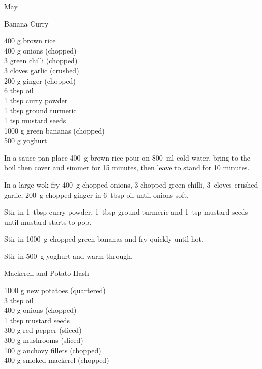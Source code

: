 \begin{menu}{May}
    \begin{recipe}{2}{Banana Curry}%
		\begin{ingredients}
		400 g brown rice  \\
	400 g onions (chopped) \\
	3  green chilli (chopped) \\
	3 cloves garlic (crushed) \\
	200 g ginger (chopped) \\
	6 tbsp oil  \\
	1 tbsp curry powder  \\
	1 tbsp ground turmeric  \\
	1 tsp mustard seeds  \\
	1000 g green bananas (chopped) \\
	500 g yoghurt  \\
	
		\end{ingredients}
	
	
	
    \begin{instructions}
    \item 
    In a
    sauce pan
    place
    400~g  brown rice
    pour on
    800~ml  cold water,
    bring to the boil then cover and simmer for 15 minutes,
    then leave to stand for 10 minutes.
  \item 
        In a large wok fry
        400~g chopped onions,
        3 chopped green chilli,
        3~cloves crushed garlic,
        200~g chopped ginger
        in
        6~tbsp  oil
        until onions soft.
      \item 
        Stir in
        1~tbsp  curry powder,
        1~tbsp  ground turmeric
        and
        1~tsp  mustard seeds
        until mustard starts to pop.
      \item 
        Stir in
        1000~g chopped green bananas
        and fry quickly until hot.
      \item 
        Stir in 500~g  yoghurt and warm through.
      
    \end{instructions}
    \end{recipe}%
  
    \begin{recipe}{2}{Mackerell and Potato Hash}%
		\begin{ingredients}
		1000 g new potatoes (quartered) \\
	3 tbsp oil  \\
	400 g onions (chopped) \\
	1 tbsp mustard seeds  \\
	300 g red pepper (sliced) \\
	300 g mushrooms (sliced) \\
	100 g anchovy fillets (chopped) \\
	400 g smoked mackerel (chopped) \\
	

\end{ingredients}
\end{recipe}
\end{menu}
